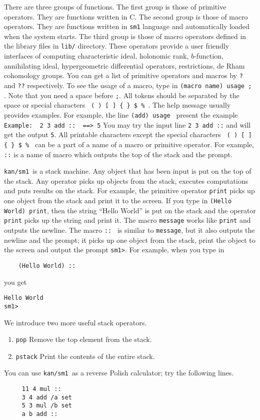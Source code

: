\documentclass{article}
\def\kansm{ {\tt kan/sm1}\ }
\begin{document}
There are three groups of functions. 
The first group is those of primitive operators.
They are functions written in C.
The second group is those of macro operators.
They are functions written in {\tt sm1} language and automatically
loaded when the system starts.
The third group is those of macro operators defined in the library files
in {\tt lib/} directory.
These operators provide a user friendly interfaces of computing
characteristic ideal, holonomic rank, $b$-function, annihilating
ideal, hypergeometric differential operators,
restrictions, de Rham cohomology groups.
You can get a list of primitive operators and macros
by {\tt ?} and {\tt ??} respectively.
To see the usage of a macro, type in
{\tt (macro name) usage ; }.
Note that you need a space before {\tt ;}.
All tokens should be separated by the space
or special characters \verb+ ( ) [ ] { } $ % +.
The help message usually provides examples.
For example, the line
{\tt (add) usage } present the example
\verb+ Example:  2 3 add ::  ==> 5+
You may try the input line
{\tt 2 3 add ::}
and will get the output {\tt 5}.
All printable characters except the special characters
\verb+ ( ) [ ] { } $ % +
can be a part of a name
of a macro or primitive operator.
For example, {\tt ::} is a name of macro which
outputs the top of the stack and the prompt.


\kansm is a stack machine.
Any object that has been input is put on the top of the stack.
Any operator picks up objects from the stack, executes computations and
puts results on the stack.
For example, the primitive operator {\tt print} picks up one object
from the stack and print it to the screen.
If you type in
{\tt (Hello World) print},
then the string ``Hello World'' is put on the stack and the operator
{\tt print} picks up the string and print it.
The macro {\tt message} works like {\tt print} and outputs the newline.
The macro {\tt :: } is similar to {\tt message}, 
but it also outputs the newline and the prompt;
it picks up one object from the stack, print the object to the screen and
output the prompt {\tt sm1>}.
For example, when you type in
\begin{verbatim}
    (Hello World) ::
\end{verbatim}
you get
\begin{verbatim}
Hello World
sm1>
\end{verbatim}
We introduce two more useful stack operators.
\begin{enumerate}
\item[] {\tt pop} \quad Remove the top element from the stack.
\item[] {\tt pstack} \quad Print the contents of the entire stack.
\end{enumerate}
You can use \kansm as a reverse Polish calculator; try the following lines.
\begin{verbatim}
     11 4 mul ::
     3 4 add /a set
     5 3 mul /b set
     a b add ::
\end{verbatim}
\end{document}
